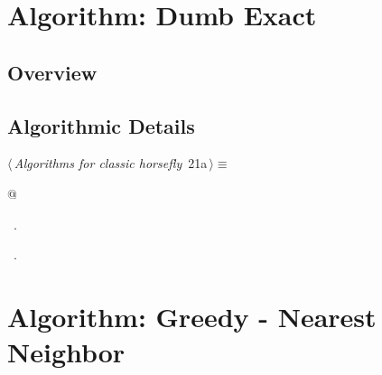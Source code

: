 \documentclass[12pt]{report}
\begin{document}
\newpage

\section{Algorithm: Dumb Exact} 

\subsection{Overview} 
\blindtext

\subsection{Algorithmic Details}

\begin{flushleft} \small
\begin{minipage}{\linewidth}\label{scrap9}\raggedright\small
{} $\langle\,${\itshape Algorithms for classic horsefly}\nobreak\ {\footnotesize {21a}}$\,\rangle\equiv$
\vspace{-1ex}
\begin{list}{}{} \item
\mbox{}\verb@   @\\
\mbox{}\verb@@{\NWsep}
\end{list}
\vspace{-1.5ex}
\footnotesize
\begin{list}{}{\setlength{\itemsep}{-\parsep}\setlength{\itemindent}{-\leftmargin}}
\item \NWtxtMacroDefBy\ .
\item \NWtxtMacroRefIn\ .

\item{}
\end{list}
\end{minipage}\vspace{4ex}
\end{flushleft}
\section{Algorithm: Greedy - Nearest Neighbor}  \blindtext
\end{document}
